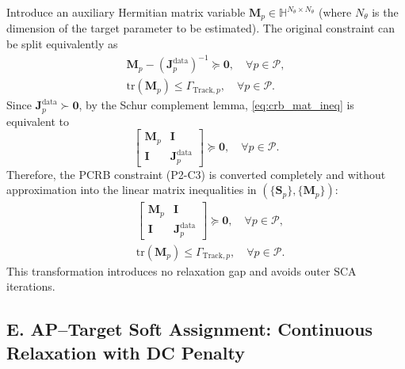 \documentclass[12pt,a4paper]{article}
\newcommand{\mat}[1]{\mathbf{#1}}
\newcommand{\tr}{\text{tr}}
\begin{document}
Introduce an auxiliary Hermitian matrix variable $\mat{M}_p \in \mathbb{H}^{N_\theta \times N_\theta}$ (where $N_\theta$ is the dimension of the target parameter to be estimated). The original constraint can be split equivalently as
\begin{subequations}\label{eq:crb_decouple}
\begin{align}
\mat{M}_p - (\mat{J}_p^{\text{data}})^{-1} \succeq \mat{0}, \quad \forall p \in \mathcal{P}, \label{eq:crb_mat_ineq} \\
\tr(\mat{M}_p) \leq \Gamma_{\text{Track},p}, \quad \forall p \in \mathcal{P}. \label{eq:crb_trace_ineq}
\end{align}
\end{subequations}
Since $\mat{J}_p^{\text{data}} \succ \mat{0}$, by the Schur complement lemma, \eqref{eq:crb_mat_ineq} is equivalent to
\begin{equation}\label{eq:crb_lmi}
\begin{bmatrix} \mat{M}_p & \mat{I} \\ \mat{I} & \mat{J}_p^{\text{data}} \end{bmatrix} \succeq \mat{0}, \quad \forall p \in \mathcal{P}.
\end{equation}
Therefore, the PCRB constraint (P2-C3) is converted completely and without approximation into the linear matrix inequalities in $(\{\mat{S}_p\}, \{\mat{M}_p\})$:
\begin{subequations}\label{eq:crb_lmi_final}
\begin{align}
& \begin{bmatrix} \mat{M}_p & \mat{I} \\ \mat{I} & \mat{J}_p^{\text{data}} \end{bmatrix} \succeq \mat{0}, \quad \forall p \in \mathcal{P}, \label{eq:crb_lmi_final_a} \\
& \tr(\mat{M}_p) \leq \Gamma_{\text{Track},p}, \quad \forall p \in \mathcal{P}. \label{eq:crb_lmi_final_b}
\end{align}
\end{subequations}
This transformation introduces no relaxation gap and avoids outer SCA iterations.

\subsection*{E. AP--Target Soft Assignment: Continuous Relaxation with DC Penalty}
\end{document}

